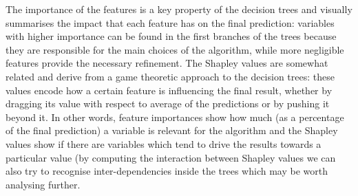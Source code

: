 The importance of the features is a key property of the decision trees and visually summarises the impact that each feature has on the final prediction: variables with higher importance can be found in the first branches of the trees because they are responsible for the main choices of the algorithm, while more negligible features provide the necessary refinement.
The Shapley values are somewhat related and derive from a game theoretic approach to the decision trees: these values encode how a certain feature is influencing the final result, whether by dragging its value with respect to average of the predictions or by pushing it beyond it.
In other words, feature importances show how much (as a percentage of the final prediction) a variable is relevant for the algorithm and the Shapley values show if there are variables which tend to drive the results towards a
particular value (by computing the interaction between Shapley values we can also try to recognise inter-dependencies inside the trees which may be worth analysing further.

